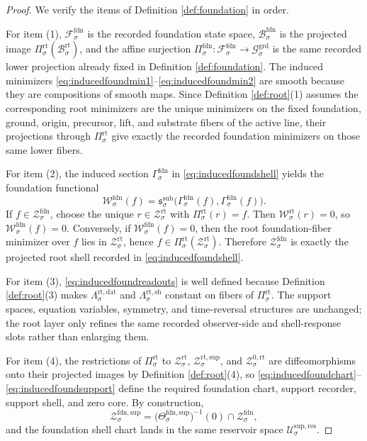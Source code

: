 \documentclass[11pt]{article}
\newcommand{\SubPair}[1]{\mathfrak s_{#1}^{\mathrm{sub}}}
\newcommand{\GroundSpace}[1]{\mathcal G_{#1}^{\mathrm{grd}}}
\newcommand{\FoundSpace}[1]{\mathcal F_{#1}^{\mathrm{fdn}}}
\newcommand{\FoundBody}[1]{\mathcal B_{#1}^{\mathrm{fdn}}}
\newcommand{\FoundProj}[1]{\Pi_{#1}^{\mathrm{fdn}}}
\newcommand{\FoundSection}[1]{\Gamma_{#1}^{\mathrm{fdn}}}
\newcommand{\FoundFunctional}[1]{\mathscr W_{#1}^{\mathrm{fdn}}}
\newcommand{\FoundShellSet}[1]{\mathcal Z_{#1}^{\mathrm{fdn}}}
\newcommand{\FoundSupport}[1]{\Theta_{#1}^{\mathrm{fdn,sup}}}
\newcommand{\FoundSupportShell}[1]{\mathcal Z_{#1}^{\mathrm{fdn,sup}}}
\newcommand{\RootBody}[1]{\mathcal B_{#1}^{\mathrm{rt}}}
\newcommand{\RootProj}[1]{\Pi_{#1}^{\mathrm{rt}}}
\newcommand{\RootFunctional}[1]{\mathscr W_{#1}^{\mathrm{rt}}}
\newcommand{\RootData}[1]{\Lambda_{#1}^{\mathrm{rt,dat}}}
\newcommand{\RootShellMap}[1]{\Lambda_{#1}^{\mathrm{rt,sh}}}
\newcommand{\RootShellSet}[1]{\mathcal Z_{#1}^{\mathrm{rt}}}
\newcommand{\RootSupportShell}[1]{\mathcal Z_{#1}^{\mathrm{rt,sup}}}
\newcommand{\RootZeroCore}[1]{\mathcal Z_{#1}^{0,\mathrm{rt}}}
\newcommand{\ResSpace}[1]{\mathcal U_{#1}^{\mathrm{sup,res}}}
\begin{document}
\begin{proof}
We verify the items of Definition \ref{def:foundation} in order.

For item (1), \(\FoundSpace{\sigma}\) is the recorded foundation state space, \(\FoundBody{\sigma}\) is the projected image \(\RootProj{\sigma}(\RootBody{\sigma})\), and the affine surjection \(\FoundProj{\sigma}:\FoundSpace{\sigma}\to\GroundSpace{\sigma}\) is the same recorded lower projection already fixed in Definition \ref{def:foundation}. The induced minimizers \eqref{eq:inducedfoundmin1}--\eqref{eq:inducedfoundmin2} are smooth because they are compositions of smooth maps. Since Definition \ref{def:root}(1) assumes the corresponding root minimizers are the unique minimizers on the fixed foundation, ground, origin, precursor, lift, and substrate fibers of the active line, their projections through \(\RootProj{\sigma}\) give exactly the recorded foundation minimizers on those same lower fibers.

For item (2), the induced section \(\FoundSection{\sigma}\) in \eqref{eq:inducedfoundshell} yields the foundation functional
\[
\FoundFunctional{\sigma}(f)
=
\SubPair{\sigma}\bigl(\FoundSection{\sigma}(f),\FoundSection{\sigma}(f)\bigr).
\]
If \(f\in\FoundShellSet{\sigma}\), choose the unique \(r\in\RootShellSet{\sigma}\) with \(\RootProj{\sigma}(r)=f\). Then \(\RootFunctional{\sigma}(r)=0\), so \(\FoundFunctional{\sigma}(f)=0\). Conversely, if \(\FoundFunctional{\sigma}(f)=0\), then the root foundation-fiber minimizer over \(f\) lies in \(\RootShellSet{\sigma}\), hence \(f\in\RootProj{\sigma}(\RootShellSet{\sigma})\). Therefore \(\FoundShellSet{\sigma}\) is exactly the projected root shell recorded in \eqref{eq:inducedfoundshell}.

For item (3), \eqref{eq:inducedfoundreadouts} is well defined because Definition \ref{def:root}(3) makes \(\RootData{\sigma}\) and \(\RootShellMap{\sigma}\) constant on fibers of \(\RootProj{\sigma}\). The support spaces, equation variables, symmetry, and time-reversal structures are unchanged; the root layer only refines the same recorded observer-side and shell-response slots rather than enlarging them.

For item (4), the restrictions of \(\RootProj{\sigma}\) to \(\RootShellSet{\sigma}\), \(\RootSupportShell{\sigma}\), and \(\RootZeroCore{\sigma}\) are diffeomorphisms onto their projected images by Definition \ref{def:root}(4), so \eqref{eq:inducedfoundchart}--\eqref{eq:inducedfoundsupport} define the required foundation chart, support recorder, support shell, and zero core. By construction,
\[
\FoundSupportShell{\sigma}
=
\bigl(\FoundSupport{\sigma}\bigr)^{-1}(0)\cap\FoundShellSet{\sigma},
\]
and the foundation shell chart lands in the same reservoir space \(\ResSpace{\sigma}\).


\end{proof}
\end{document}
